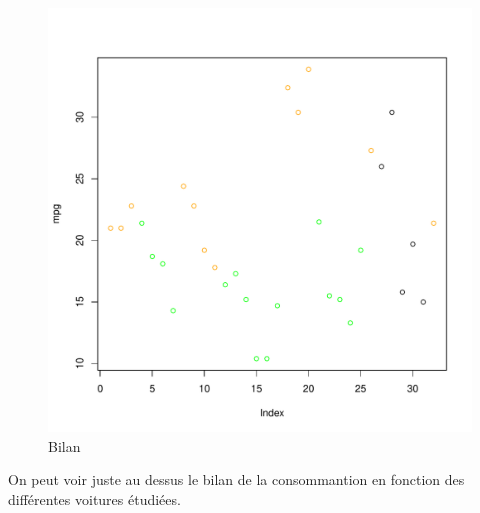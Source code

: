 \documentclass[a4]{article}
\begin{document}
\begin{figure}[h]
\includegraphics[scale=0.5]{graphicD.pdf}
\caption{Bilan}
\label{Bilan Du Graphique}
\end{figure}

On peut voir juste au dessus le bilan de la consommantion en fonction des différentes voitures étudiées.
\end{document}
